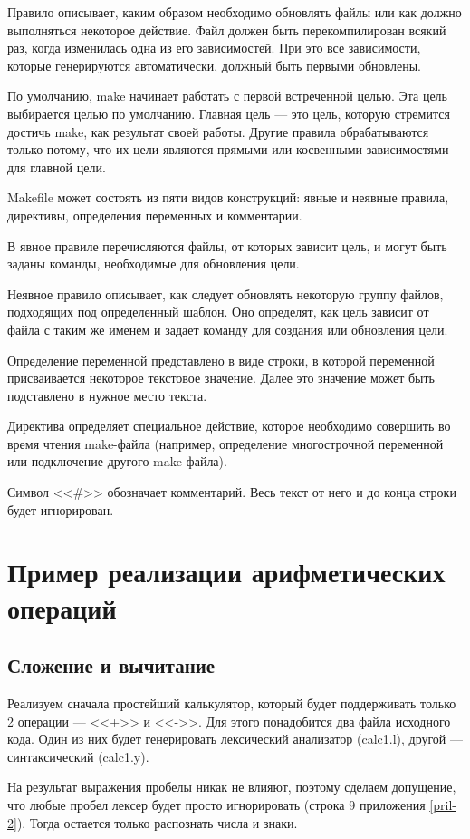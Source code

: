 \documentclass[bachelor, och, coursework, times]{SCWorks}
\begin{document}
Правило описывает, каким образом необходимо обновлять файлы или как должно выполняться некоторое действие. Файл должен быть перекомпилирован всякий раз, когда изменилась одна из его зависимостей. При это все зависимости, которые генерируются автоматически, должный быть первыми обновлены. 

По умолчанию, make начинает работать с первой встреченной целью. Эта цель выбирается целью по умолчанию. Главная цель --- это цель, которую стремится достичь make, как результат своей работы. Другие правила обрабатываются только потому, что их цели являются прямыми или косвенными зависимостями для главной цели. ~\cite{make2}

Makefile может состоять из пяти видов конструкций: явные и неявные правила, директивы, определения переменных и комментарии.

В явное правиле перечисляются файлы, от которых зависит цель, и могут быть заданы команды, необходимые для обновления цели.

Неявное правило описывает, как следует обновлять некоторую группу файлов, подходящих под определенный шаблон. Оно определят, как цель зависит от файла с таким же именем и задает команду для создания или обновления цели.

Определение переменной представлено в виде строки, в которой переменной присваивается некоторое текстовое значение. Далее это значение может быть подставлено в нужное место текста.

Директива определяет специальное действие, которое необходимо совершить во время чтения make-файла (например, определение многострочной переменной или подключение другого make-файла).

Символ <<\#>> обозначает комментарий. Весь текст от него и до конца строки будет игнорирован. 

\section{Пример реализации арифметических операций}
\subsection{Сложение и вычитание}
Реализуем сначала простейший калькулятор, который будет поддерживать только 2 операции --- <<+>> и <<->>.
Для этого понадобится два файла исходного кода. Один из них будет генерировать лексический анализатор (calc1.l), другой --- синтаксический (calc1.y).

На результат выражения пробелы никак не влияют, поэтому сделаем допущение, что любые пробел лексер будет просто игнорировать (строка 9 приложения \ref{pril-2}). Тогда остается только распознать числа и знаки.
\end{document}
